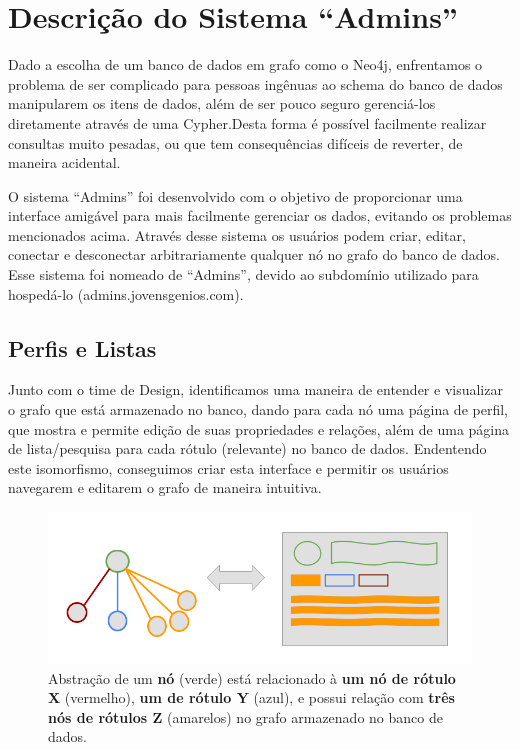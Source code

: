 \chapter{Descrição do Sistema ``Admins''}
\label{chap4}

Dado a escolha de um banco de dados em grafo como o Neo4j, enfrentamos o problema de ser complicado para pessoas ingênuas ao schema do banco de dados manipularem os itens de dados, além de ser pouco seguro gerenciá-los diretamente através de uma Cypher.Desta forma é possível facilmente realizar consultas muito pesadas, ou que tem consequências difíceis de reverter, de maneira acidental.

O sistema ``Admins'' foi desenvolvido com o objetivo de proporcionar uma interface amigável para mais facilmente gerenciar os dados, evitando os problemas mencionados acima. Através desse sistema os usuários podem criar, editar, conectar e desconectar arbitrariamente qualquer nó no grafo do banco de dados. Esse sistema foi nomeado de ``Admins'', devido ao subdomínio utilizado para hospedá-lo (admins.jovensgenios.com).

\section{Perfis e Listas}

Junto com o time de Design, identificamos uma maneira de entender e visualizar o grafo que está armazenado no banco, dando para cada nó uma página de perfil, que mostra e permite edição de suas propriedades e relações, além de uma página de lista/pesquisa para cada rótulo (relevante) no banco de dados. Endentendo este isomorfismo, conseguimos criar esta interface e permitir os usuários navegarem e editarem o grafo de maneira intuitiva.

\begin{figure}[H]
    \centering
    \includegraphics[width=1.0\linewidth]{Imagens/chap04/perfil-isomorfismo.png}
    \caption{Abstração de um \textbf{nó} (verde) está relacionado à \textbf{um nó de rótulo X} (vermelho), \textbf{um de rótulo Y} (azul), e possui relação com \textbf{três nós de rótulos Z} (amarelos) no grafo armazenado no banco de dados.}
    \label{fig:isomorphism}
\end{figure}

